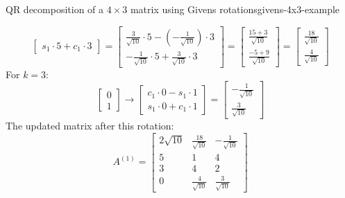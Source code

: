 \begin{example}{QR decomposition of a $4\times3$ matrix using Givens rotations}{givens-4x3-example}
\begin{itemize}
\[\begin{bmatrix}
                s_1 \cdot 5 + c_1 \cdot 3
            \end{bmatrix}
            =
            \begin{bmatrix}
                \frac{3}{\sqrt{10}} \cdot 5 - \left(-\frac{1}{\sqrt{10}}\right) \cdot 3 \\
                -\frac{1}{\sqrt{10}} \cdot 5 + \frac{3}{\sqrt{10}} \cdot 3
            \end{bmatrix}
            =
            \begin{bmatrix}
                \frac{15 + 3}{\sqrt{10}} \\
                \frac{-5 + 9}{\sqrt{10}}
            \end{bmatrix}
            =
            \begin{bmatrix}
                \frac{18}{\sqrt{10}} \\
                \frac{4}{\sqrt{10}}
            \end{bmatrix}
        \]
        For $k=3$:
        \[
            \begin{bmatrix}
                0 \\
                1
            \end{bmatrix}
            \to
            \begin{bmatrix}
                c_1 \cdot 0 - s_1 \cdot 1 \\
                s_1 \cdot 0 + c_1 \cdot 1
            \end{bmatrix}
            =
            \begin{bmatrix}
                -\frac{1}{\sqrt{10}} \\
                \frac{3}{\sqrt{10}}
            \end{bmatrix}
        \]
        The updated matrix after this rotation:
        \[
            A^{(1)} = \begin{bmatrix}
                2\sqrt{10} & \frac{18}{\sqrt{10}} & -\frac{1}{\sqrt{10}} \\
                5 & 1 & 4 \\
                3 & 4 & 2 \\
                0 & \frac{4}{\sqrt{10}} & \frac{3}{\sqrt{10}}
            \end{bmatrix}
        \]


\end{itemize}
\end{example}
